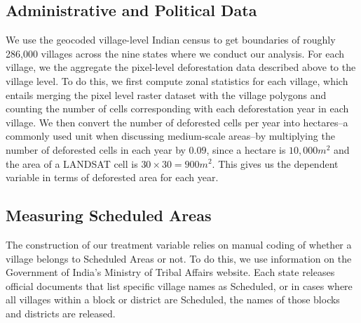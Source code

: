 \documentclass[12pt,reqno]{article}
\begin{document}


\subsection{Administrative and Political Data} %
\label{sub:administrative_and_political_data}

We use the \textcite{infomap2001indiamap} geocoded village-level Indian census to get boundaries of roughly 286,000 villages across the nine states where we conduct our analysis. For each village, we the aggregate the pixel-level deforestation data described above to the village level. To do this, we first compute zonal statistics for each village, which entails merging the pixel level raster dataset with the village polygons and counting the number of cells corresponding with each deforestation year in each village.  We then convert the number of deforested cells per year into hectares--a commonly used unit when discussing medium-scale areas--by multiplying the number of deforested cells in each year by $0.09$, since a hectare is $10,000 m^2$ and the area of a LANDSAT cell is $30\times30=900 m^2$. This gives us the dependent variable in terms of deforested area for each year.


\subsection{Measuring Scheduled Areas} 

The construction of our treatment variable relies on manual coding of whether a village belongs to Scheduled Areas or not. To do this, we use information on the Government of India's Ministry of Tribal Affairs website. Each state releases official documents that list specific village names as Scheduled, or in cases where all villages within a block or district are Scheduled, the names of those blocks and districts are released.
\end{document}
